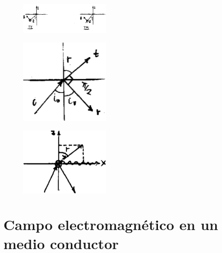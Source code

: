 \documentclass[10pt,oneside]{CBFT_book}
\begin{document}
\begin{figure}[htb]
	\begin{center}
	\includegraphics[width=0.4\textwidth]{images/fig_ft1_reflex2.pdf}	 
	\end{center}
	\caption{}
\end{figure} 

\begin{figure}[htb]
	\begin{center}
	\includegraphics[width=0.4\textwidth]{images/fig_ft1_reflex3.pdf}	 
	\end{center}
	\caption{}
\end{figure} 

\begin{figure}[htb]
	\begin{center}
	\includegraphics[width=0.4\textwidth]{images/fig_ft1_reflex4.pdf}	 
	\end{center}
	\caption{}
\end{figure} 

\section{Campo electromagnético en un medio conductor}
\end{document}
